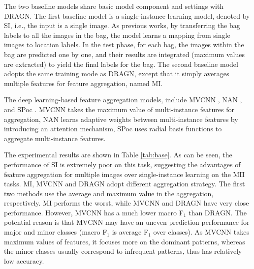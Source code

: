 \documentclass[10pt,twocolumn,letterpaper]{article}
\begin{document}
The two baseline models share basic model component and settings with DRAGN. The first baseline model is a single-instance learning model, denoted by SI, i.e., the input is a single image. As previous works, by transferring the bag labels to all the images in the bag, the model learns a mapping from single images to location labels. In the test phase, for each bag, the images within the bag are predicted one by one, and their results are integrated (maximum values are extracted) to yield the final labels for the bag. The second baseline model adopts the same training mode as DRAGN, except that it simply averages multiple features for feature aggregation, named MI. 

The deep learning-based feature aggregation models, include MVCNN \cite{ref23}, NAN \cite{ref24}, and SPoc \cite{ref28}. MVCNN takes the maximum value of multi-instance features for aggregation, NAN learns adaptive weights between multi-instance features by introducing an attention mechanism, SPoc uses radial basis functions to aggregate multi-instance features. 

The experimental results are shown in Table \ref{tab:base}. As can be seen, the performance of SI is extremely poor on this task, suggesting the advantages of feature aggregation for multiple images over single-instance learning on the MII tasks. MI, MVCNN and DRAGN adopt different aggregation strategy. The first two methods use the average and maximum value in the aggregation, respectively. MI performs the worst, while MVCNN and DRAGN have very close performance. However, MVCNN has a much lower macro F$_1$ than DRAGN. The potential reason is that MVCNN may have an uneven prediction performance for major and minor classes (macro F$_1$ is average F$_1$ over classes). As MVCNN takes maximum values of features, it focuses more on the dominant patterns, whereas the minor classes usually correspond to infrequent patterns, thus has relatively low accuracy. 
\end{document}
